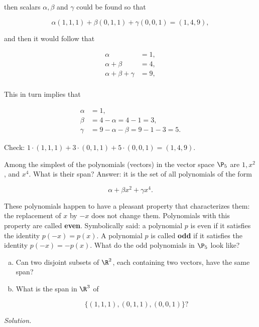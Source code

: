 then scalars $\alpha, \beta$ and $\gamma$ could be found so that

\begin{equation}
    \alpha(1,1,1) + \beta(0,1,1) + \gamma(0,0,1) = (1,4,9),
\end{equation}

and then it would follow that

\begin{align}
    \alpha                  & = 1, \\
    \alpha + \beta          & = 4, \\
    \alpha + \beta + \gamma & = 9, \\
\end{align}

This in turn implies that

\begin{align}
    \alpha & = 1,                                  \\
    \beta  & = 4 - \alpha = 4 - 1 = 3,             \\
    \gamma & = 9 - \alpha - \beta = 9 - 1 - 3 = 5.
\end{align}

Check: $1 \cdot (1,1,1) + 3 \cdot (0,1,1) + 5 \cdot (0,0,1) = (1,4,9)$.

Among the simplest of the polynomials (vectors) in the vector space $\P_5$ are $1, x^2$, and $x^4$. What is their span? Answer: it is the set of all polynomials of the form

\begin{equation}
    \alpha + \beta x^2 + \gamma x^4.
\end{equation}

These polynomials happen to have a pleasant property that characterizes them: the replacement of $x$ by $-x$ does not change them. Polynomials with this property are called \textbf{even}. Symbolically said: a polynomial $p$ is even if it satisfies the identity $p(-x) = p(x)$. A polynomial $p$ is called \textbf{odd} if it satisfies the identity $p(-x) = -p(x)$. What do the odd polynomials in $\P_5$ look like?

\begin{problem}
\begin{enumerate}[(a)]
    \item Can two disjoint subsets of $\R^2$, each containing two vectors, have the same span?
    \item What is the span in $\R^3$ of

          \begin{equation}
              \{(1,1,1),(0,1,1),(0,0,1)\}?
          \end{equation}
\end{enumerate}
\end{problem}

\textit{Solution.}